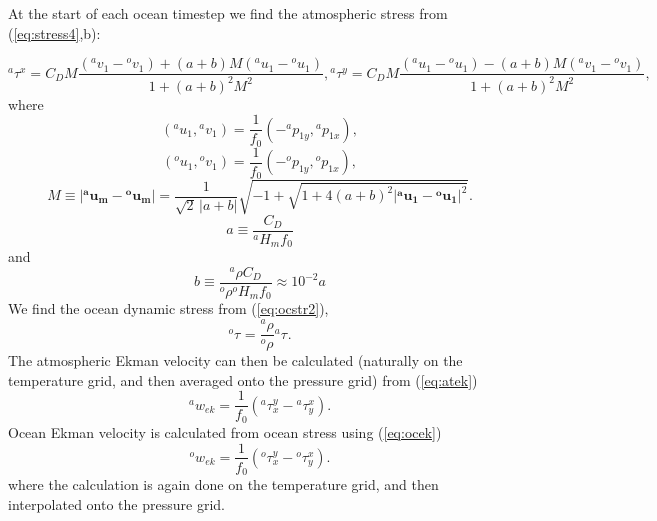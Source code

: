 \documentclass[11pt, a4paper,twoside]{article}
\newcommand{\rhb}[1]{{{}^{#1}\rho}}
\newcommand{\p}[2]{{{}^{#1}p_{#2}}}
\newcommand{\uu}[2]{{{}^{#1}u_{#2}}}
\newcommand{\vv}[2]{{{}^{#1}v_{#2}}}
\newcommand{\ek}[1]{{{}^{#1}w_{ek}}}
\newcommand{\HH}[2]{{{}^{#1}H_{#2}}}
\newcommand{\tx}[2]{{}^{#1}\tau^{#2}}
\newcommand{\vc}[1]{\mathbf{#1}}
\numberwithin{equation}{section}
\begin{document}
At the start of each ocean timestep we find the atmospheric stress from (\ref{eq:stress4},b):

\begin{subequations}
\begin{equation}\label{eq:stress5}
\tx{a}{x}  =  C_D M \frac{(\vv{a}{1} - \vv{o}{1}) + (a + b) M (\uu{a}{1} - \uu{o}{1}) }{1 +  (a + b)^2 M^2},
\end{equation}
\begin{equation}\label{eq:veldif5}
\tx{a}{y} =  C_D M \frac{(\uu{a}{1} - \uu{o}{1}) - (a + b) M  (\vv{a}{1} - \vv{o}{1})} {1 +  (a + b)^2 M^2},
\end{equation}
\end{subequations}
where
\begin{equation}
( \uu{a}{1}, \vv{a}{1}) = \frac{1}{f_0} \left( - \p{a}{1y} ,\p{a}{1x}\right),
\end{equation}
\begin{equation}
( \uu{o}{1}, \vv{o}{1}) = \frac{1}{f_0} \left( - \p{o}{1y} ,\p{o}{1x}\right),
\end{equation}
\begin{equation}
M \equiv \lvert \vc{\uu{a}{m}} - \vc{\uu{o}{m}} \rvert = \frac{1 }{\sqrt{2}\, \lvert a +b \rvert} \sqrt{-1 +\sqrt{1 + 4 (a+b)^2 \lvert \vc{\uu{a}{1}} - \vc{\uu{o}{1}} \rvert ^2}}.
\end{equation}
\[a \equiv \frac{C_D}{\HH{a}{m}f_0}\]
and
\[b \equiv \frac{\rhb{a}C_D}{\rhb{o}\HH{o}{m}f_0} \approx 10^{-2}a\]
We find the ocean dynamic stress from (\ref{eq:ocstr2}), 
\begin{equation}\label{eq:ocstr1}
\tx{o}{} = \frac{\rhb{a}}{\rhb{o}}\tx{a}{}.
\end{equation}
The atmospheric Ekman velocity can then be calculated (naturally on the temperature grid, and then averaged onto the pressure grid) from (\ref{eq:atek}) 
\begin{equation}\label{eq:atek1}
\ek{a} = \frac{1}{f_0}(\tx{a}{y}_x  - \tx{a}{x}_y).
\end{equation}
Ocean Ekman velocity is calculated from ocean stress using (\ref{eq:ocek})
\begin{equation}\label{eq:ocek1}
\ek{o} = \frac{1}{f_0}(\tx{o}{y}_x  - \tx{o}{x}_y).
\end{equation}
where the calculation is again done on the temperature grid, and then interpolated onto the pressure grid.
\end{document}
